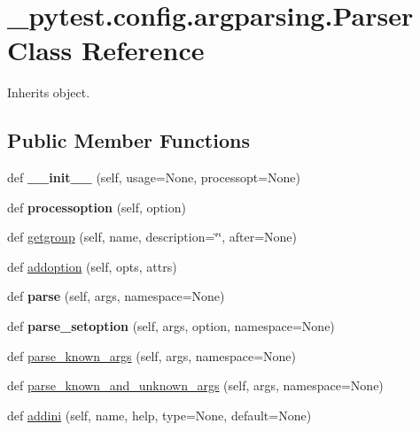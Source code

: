 \hypertarget{class__pytest_1_1config_1_1argparsing_1_1_parser}{}\section{\+\_\+pytest.\+config.\+argparsing.\+Parser Class Reference}
\label{class__pytest_1_1config_1_1argparsing_1_1_parser}


Inherits object.

\subsection*{Public Member Functions}
\begin{DoxyCompactItemize}
\item 
\mbox{\label{class__pytest_1_1config_1_1argparsing_1_1_parser_a6299e5bfcddcdf5977f5bd2b285aad0f}} 
def {\bfseries \+\_\+\+\_\+init\+\_\+\+\_\+} (self, usage=None, processopt=None)
\item 
\mbox{\label{class__pytest_1_1config_1_1argparsing_1_1_parser_a27743d7db2ce5b5f1446d0a9a1b32646}} 
def {\bfseries processoption} (self, option)
\item 
def \hyperlink{class__pytest_1_1config_1_1argparsing_1_1_parser_ad886d8d67ef88b3fb6b730a1d3a89499}{getgroup} (self, name, description=\char`\"{}\char`\"{}, after=None)
\item 
def \hyperlink{class__pytest_1_1config_1_1argparsing_1_1_parser_a8b9a087d79364eb84f17bd2bd5098c96}{addoption} (self, opts, attrs)
\item 
\mbox{\label{class__pytest_1_1config_1_1argparsing_1_1_parser_acc460b506950649135e768195df911e5}} 
def {\bfseries parse} (self, args, namespace=None)
\item 
\mbox{\label{class__pytest_1_1config_1_1argparsing_1_1_parser_a56d2c51cdbfdbde04a496d554af5a5af}} 
def {\bfseries parse\+\_\+setoption} (self, args, option, namespace=None)
\item 
def \hyperlink{class__pytest_1_1config_1_1argparsing_1_1_parser_a470e379f33643965fe9a019c319c10d8}{parse\+\_\+known\+\_\+args} (self, args, namespace=None)
\item 
def \hyperlink{class__pytest_1_1config_1_1argparsing_1_1_parser_a6ea809dfa8c13b61eec15e553aba3517}{parse\+\_\+known\+\_\+and\+\_\+unknown\+\_\+args} (self, args, namespace=None)
\item 
def \hyperlink{class__pytest_1_1config_1_1argparsing_1_1_parser_a5896682707d2ca72364b05c1d7a99cec}{addini} (self, name, help, type=None, default=None)
\end{DoxyCompactItemize}
